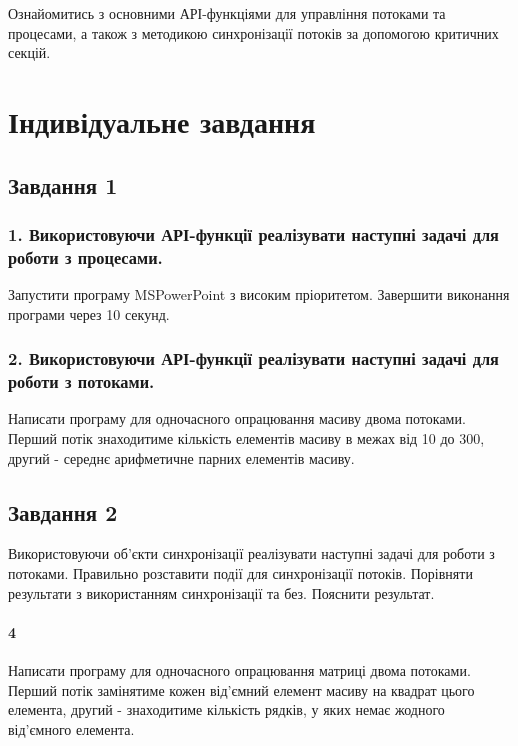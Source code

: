 \documentclass[a4paper, 12pt, oneside]{extarticle}
\begin{document}
\Margins


Ознайомитись з основними АРІ-функціями для управління потоками та
процесами, а також з методикою синхронізації потоків за допомогою
критичних секцій.

\section*{Індивідуальне завдання}

\subsection*{Завдання 1}

\subsubsection*{1. Використовуючи АРІ-функції реалізувати наступні задачі для роботи з процесами.}

Запустити програму MSPowerPoint з високим пріоритетом. Завершити виконання програми через 10 секунд.

\subsubsection*{2. Використовуючи АРІ-функції реалізувати наступні задачі для роботи з потоками.}

Написати програму для одночасного опрацювання масиву двома
потоками. Перший потік знаходитиме кількість елементів масиву в межах від 10
до 300, другий - середнє арифметичне парних елементів масиву.

\subsection*{Завдання 2}

Використовуючи об’єкти синхронізації реалізувати наступні задачі для
роботи з потоками. Правильно розставити події для синхронізації потоків.
Порівняти результати з використанням синхронізації та без. Пояснити результат.

\paragraph{4} Написати програму для одночасного опрацювання матриці двома
потоками. Перший потік замінятиме кожен від’ємний елемент масиву на квадрат
цього елемента, другий - знаходитиме кількість рядків, у яких немає жодного
від’ємного елемента.
\end{document}
